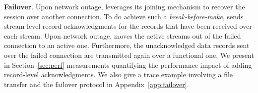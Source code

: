 \textbf{Failover}.
Upon network outage, \tcpls leverages its joining mechanism to recover the session
over another \tcp connection. To do achieve such a \emph{break-before-make}, \tcpls sends stream-level record
acknowledgments for the records that have been received
over each stream. Upon network outage, \tcpls moves the
active streams out of the failed \tcp connection to an active one. Furthermore,
the unacknowledged data records sent over the failed \tcp connection are
transmitted again over a functional one.
We present in Section~\ref{sec:perf} measurements quantifying the
performance impact of adding \tcpls record-level acknowledgments. We also give a
trace example involving a file transfer and the failover protocol in
Appendix~\ref{app:failover}.

